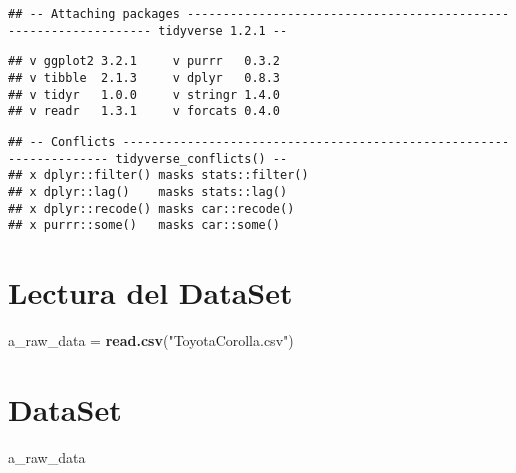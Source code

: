 \documentclass[]{article}
\newenvironment{Shaded}{\begin{snugshade}}{\end{snugshade}}
\newcommand{\KeywordTok}[1]{\textcolor[rgb]{0.13,0.29,0.53}{\textbf{#1}}}
\newcommand{\NormalTok}[1]{#1}
\newcommand{\StringTok}[1]{\textcolor[rgb]{0.31,0.60,0.02}{#1}}
\begin{document}
\begin{verbatim}
## -- Attaching packages ----------------------------------------------------------------- tidyverse 1.2.1 --
\end{verbatim}

\begin{verbatim}
## v ggplot2 3.2.1     v purrr   0.3.2
## v tibble  2.1.3     v dplyr   0.8.3
## v tidyr   1.0.0     v stringr 1.4.0
## v readr   1.3.1     v forcats 0.4.0
\end{verbatim}

\begin{verbatim}
## -- Conflicts -------------------------------------------------------------------- tidyverse_conflicts() --
## x dplyr::filter() masks stats::filter()
## x dplyr::lag()    masks stats::lag()
## x dplyr::recode() masks car::recode()
## x purrr::some()   masks car::some()
\end{verbatim}

\hypertarget{lectura-del-dataset}{%
\section{Lectura del DataSet}\label{lectura-del-dataset}}

\begin{Shaded}
\begin{Highlighting}[]
\NormalTok{a_raw_data =}\StringTok{ }\KeywordTok{read.csv}\NormalTok{(}\StringTok{"ToyotaCorolla.csv"}\NormalTok{) }
\end{Highlighting}
\end{Shaded}

\hypertarget{dataset}{%
\section{DataSet}\label{dataset}}

\begin{Shaded}
\begin{Highlighting}[]
\NormalTok{a_raw_data}
\end{Highlighting}
\end{Shaded}
\end{document}
